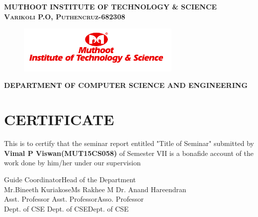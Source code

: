 \documentclass[12pt]{report}
\begin{document}
\newpage\begin{titlepage}
\center


\textsc{ \textbf{MUTHOOT INSTITUTE OF TECHNOLOGY \& SCIENCE}}\\
\textsc{\textbf{Varikoli P.O, Puthencruz-682308}}
\vspace{0.7cm}
\begin{figure}[H]
\centering
\includegraphics[width=0.7\textwidth]{logo.png}\\
\end{figure}
\vspace{0.2cm}
\textsc{\large \textbf{ DEPARTMENT OF COMPUTER SCIENCE AND ENGINEERING}}\\
\section*{\centering CERTIFICATE}
\begin{center}
 This is to certify that the seminar report entitled "Title of Seminar" submitted by \textbf{Vimal P Viswan(MUT15CS058)} of Semester VII is  a bonafide account of the work done by him/her under our supervision\\
\end{center}
\vspace{1.6cm}




\noindent Guide \hspace{3.6cm} Coordinator\hfill Head of the Department
\\
\noindent Mr.Bineeth Kuriakose\hspace{0.9cm}Ms Rakhee M \hfill Dr. Anand Hareendran\\
\noindent Asst. Professor\hspace{2.05cm} Asst. Professor\hfill Asso. Professor\\
\noindent Dept. of CSE\hspace{2.4cm} Dept. of CSE\hfill Dept. of CSE




\end{titlepage}
\newpage
{}
\end{document}
